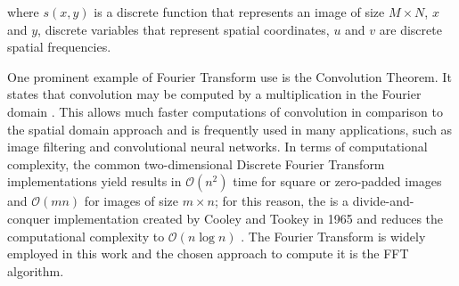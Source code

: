 \noindent where $s(x,y)$ is a discrete function that represents an image of size $M \times N$, $x$ and $y$, discrete variables that represent spatial coordinates, $u$ and $v$ are discrete spatial frequencies. 

One prominent example of Fourier Transform use is the Convolution Theorem. It states that convolution may be computed by a multiplication in the Fourier domain \cite{brigham1988fast}. This allows much faster computations of convolution in comparison to the spatial domain approach and is frequently used in many applications, such as image filtering and convolutional neural networks. In terms of computational complexity, the common two-dimensional Discrete Fourier Transform implementations yield results in $\mathcal{O}(n^{2})$ time for square or zero-padded images and $\mathcal{O}(mn)$ for images of size $m \times n$; for this reason, the  is a divide-and-conquer implementation created by Cooley and Tookey in 1965 and reduces the computational complexity to $\mathcal{O}(n \log n)$ \cite{bracewell2000fourier}. The Fourier Transform is widely employed in this work and the chosen approach to compute it is the FFT algorithm.